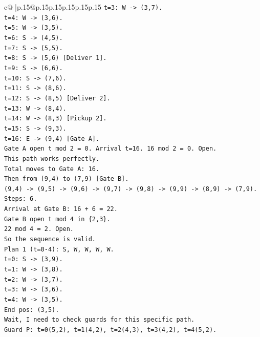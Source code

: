 \documentclass{article}
\begin{document}
{\begin{supertabular}{c@{$\;$}|p{.15\linewidth}@{}p{.15\linewidth}p{.15\linewidth}p{.15\linewidth}p{.15\linewidth}p{.15\linewidth}}
{{{\texttt{t=3: W {-}> (3,7).} \\
\texttt{t=4: W {-}> (3,6).} \\
\texttt{t=5: W {-}> (3,5).} \\
\texttt{t=6: S {-}> (4,5).} \\
\texttt{t=7: S {-}> (5,5).} \\
\texttt{t=8: S {-}> (5,6) {[}Deliver 1{]}.} \\
\texttt{t=9: S {-}> (6,6).} \\
\texttt{t=10: S {-}> (7,6).} \\
\texttt{t=11: S {-}> (8,6).} \\
\texttt{t=12: S {-}> (8,5) {[}Deliver 2{]}.} \\
\texttt{t=13: W {-}> (8,4).} \\
\texttt{t=14: W {-}> (8,3) {[}Pickup 2{]}.} \\
\texttt{t=15: S {-}> (9,3).} \\
\texttt{t=16: E {-}> (9,4) {[}Gate A{]}.} \\
\texttt{Gate A open t mod 2 = 0. Arrival t=16. 16 mod 2 = 0. Open.} \\
\texttt{This path works perfectly.} \\
\texttt{Total moves to Gate A: 16.} \\
\texttt{Then from (9,4) to (7,9) {[}Gate B{]}.} \\
\texttt{(9,4) {-}> (9,5) {-}> (9,6) {-}> (9,7) {-}> (9,8) {-}> (9,9) {-}> (8,9) {-}> (7,9).} \\
\texttt{Steps: 6.} \\
\texttt{Arrival at Gate B: 16 + 6 = 22.} \\
\texttt{Gate B open t mod 4 in \{2,3\}.} \\
\texttt{22 mod 4 = 2. Open.} \\
\texttt{So the sequence is valid.} \\
\texttt{Plan 1 (t=0{-}4): S, W, W, W, W.} \\
\texttt{t=0: S {-}> (3,9).} \\
\texttt{t=1: W {-}> (3,8).} \\
\texttt{t=2: W {-}> (3,7).} \\
\texttt{t=3: W {-}> (3,6).} \\
\texttt{t=4: W {-}> (3,5).} \\
\texttt{End pos: (3,5).} \\
\texttt{Wait, I need to check guards for this specific path.} \\
\texttt{Guard P: t=0(5,2), t=1(4,2), t=2(4,3), t=3(4,2), t=4(5,2).} \\
}}}
\end{supertabular}}
\end{document}
